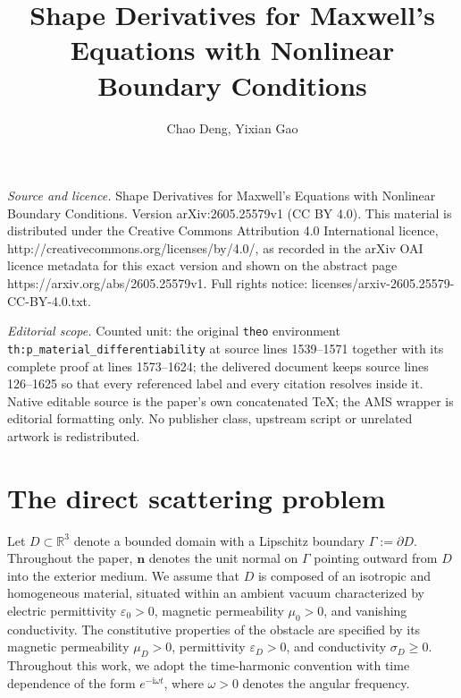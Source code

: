 \documentclass[10pt,a4paper]{amsart}
\numberwithin{equation}{section}
\begin{document}
\title[Shape Derivatives for Maxwell's Equations with Nonlinear Bou]{Shape Derivatives for Maxwell's Equations with Nonlinear Boundary Conditions}
\author{Chao Deng, Yixian Gao}
\date{}
\maketitle
\noindent\emph{Source and licence.} Shape Derivatives for Maxwell's Equations with Nonlinear Boundary Conditions. Version arXiv:2605.25579v1 (CC BY 4.0). This material is distributed under the Creative Commons Attribution 4.0 International licence, http://creativecommons.org/licenses/by/4.0/, as recorded in the arXiv OAI licence metadata for this exact version and shown on the abstract page https://arxiv.org/abs/2605.25579v1. Full rights notice: licenses/arxiv-2605.25579-CC-BY-4.0.txt.\par\smallskip
\noindent\textit{Editorial scope.} Counted unit: the original \texttt{theo} environment \texttt{th:p\_material\_differentiability} at source lines 1539--1571 together with its complete proof at lines 1573--1624; the delivered document keeps source lines 126--1625 so that every referenced label and every citation resolves inside it. Native editable source is the paper's own concatenated TeX; the AMS wrapper is editorial formatting only. No publisher class, upstream script or unrelated artwork is redistributed.
\section{The direct scattering problem} \label{sec:2}

Let \(D\subset\mathbb R^3\) denote a bounded domain with a Lipschitz boundary
\(\Gamma:=\partial D\). Throughout the paper, \(\mathbf n\) denotes the unit
normal on \(\Gamma\) pointing outward from \(D\) into the exterior medium. We assume that $D$ is composed of an isotropic and homogeneous material, situated within an ambient vacuum characterized by electric permittivity $\varepsilon_0 > 0$, magnetic permeability $\mu_0 > 0$, and vanishing conductivity. The constitutive properties of the obstacle are specified by its magnetic permeability $\mu_D > 0$, permittivity $\varepsilon_D > 0$, and conductivity $\sigma_D \geq 0$. Throughout this work, we adopt the time-harmonic convention with time dependence of the form $e^{-\mathrm{i}\omega t}$, where $\omega > 0$ denotes the angular frequency.
\end{document}
